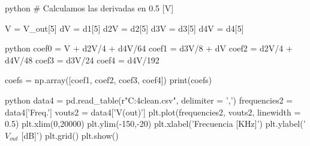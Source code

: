 \begin{sourcecode}[\label{codigo-python}]{python}
# Calculamos las derivadas en 0.5 [V]

V = V_out[5]
dV  = d1[5]
d2V = d2[5]
d3V = d3[5]
d4V = d4[5]
\end{sourcecode}

\begin{sourcecode}[\label{codigo-python}]{python}
coef0 = V + d2V/4 + d4V/64
coef1 = d3V/8 + dV
coef2 = d2V/4 + d4V/48
coef3 = d3V/24
coef4 = d4V/192

coefs = np.array([coef1, coef2, coef3, coef4])
print(coefs)
\end{sourcecode}

\begin{sourcecode}[\label{codigo-python}]{python}
data4 = pd.read_table(r"C:\Users\Usuario\Downloads\circuito4clean.csv", delimiter = ',')
frequencies2 = data4['Freq.']
vouts2 = data4['V(out)']
plt.plot(frequencies2, vouts2, linewidth = 0.5)
plt.xlim(0,20000)
plt.ylim(-150,-20)
plt.xlabel('Frecuencia [KHz]')
plt.ylabel('$V_{out}$ [dB]')
plt.grid()
plt.show()
\end{sourcecode}